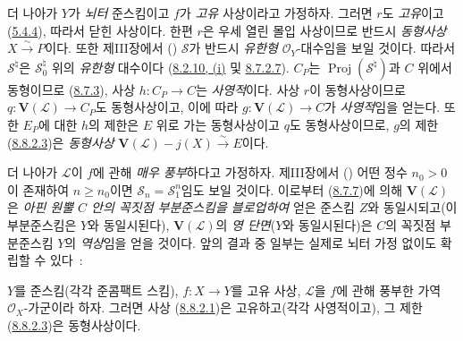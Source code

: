 \begin{remark}[8.8.3]
\label{II.8.8.3-ko}
더 나아가 $Y$가 \emph{뇌터} 준스킴이고 $f$가 \emph{고유} 사상이라고
가정하자. 그러면 $r$도 \emph{고유}이고
(\hyperref[II.5.4.4-ko]{5.4.4}), 따라서 닫힌 사상이다. 한편 $r$은
우세 열린 몰입 사상이므로 반드시 \emph{동형사상}
$X\xrightarrow{\sim}P$이다. 또한 제III장에서
() $\mathcal{S}$가 반드시
\emph{유한형} $\mathcal{O}_Y$-대수임을 보일 것이다. 따라서
$\mathcal{S}^{\natural}$은 $\mathcal{S}_0^{\natural}$ 위의
\emph{유한형} 대수이다
(\hyperref[II.8.2.10-ko]{8.2.10, (i)} 및
\hyperref[II.8.7.2.7-ko]{8.7.2.7}). $C_P$는
$\operatorname{Proj}(\mathcal{S}^{\natural})$과 $C$ 위에서 동형이므로
(\hyperref[II.8.7.3-ko]{8.7.3}), 사상 $h:C_P\to C$는
\emph{사영적}이다. 사상 $r$이 동형사상이므로
$q:\mathbf{V}(\mathcal{L})\to C_P$도 동형사상이고, 이에 따라
$g:\mathbf{V}(\mathcal{L})\to C$가 \emph{사영적}임을 얻는다. 또한
$E_P$에 대한 $h$의 제한은 $E$ 위로 가는 동형사상이고 $q$도
동형사상이므로, $g$의 제한
(\hyperref[II.8.8.2.3-ko]{8.8.2.3})은 \emph{동형사상}
$\mathbf{V}(\mathcal{L})-j(X)\xrightarrow{\sim}E$이다.

더 나아가 $\mathcal{L}$이 $f$에 관해 \emph{매우 풍부}하다고 가정하자.
제III장에서 () 어떤 정수
$n_0>0$이 존재하여 $n\geqslant n_0$이면
$\mathcal{S}_n=\mathcal{S}_1^n$임도 보일 것이다. 이로부터
(\hyperref[II.8.7.7-ko]{8.7.7})에 의해 $\mathbf{V}(\mathcal{L})$은
\emph{아핀 원뿔 $C$ 안의 꼭짓점 부분준스킴을 블로업하여} 얻은
준스킴 $Z$와 동일시되고(이 부분준스킴은 $Y$와 동일시된다),
$\mathbf{V}(\mathcal{L})$의 \emph{영 단면}($Y$와 동일시된다)은
$C$의 꼭짓점 부분준스킴 $Y$의 \emph{역상}임을 얻을 것이다. 앞의
결과 중 일부는 실제로 뇌터 가정 없이도 확립할 수 있다~:
\end{remark}

\begin{corollary}[8.8.4]
\label{II.8.8.4-ko}
$Y$를 준스킴(각각 준콤팩트 스킴), $f:X\to Y$를 고유 사상,
$\mathcal{L}$을 $f$에 관해 풍부한 가역 $\mathcal{O}_X$-가군이라 하자.
그러면 사상 (\hyperref[II.8.8.2.1-ko]{8.8.2.1})은 고유하고(각각
사영적이고), 그 제한 (\hyperref[II.8.8.2.3-ko]{8.8.2.3})은
동형사상이다.
\end{corollary}

